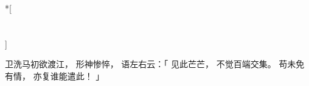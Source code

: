 
\switchcolumn[0]*[\section{}]

卫洗马初欲渡江，
形神惨悴，
语左右云：「
    见此芒芒，
    不觉百端交集。
    苟未免有情，
    亦复谁能遣此！
」

\switchcolumn



